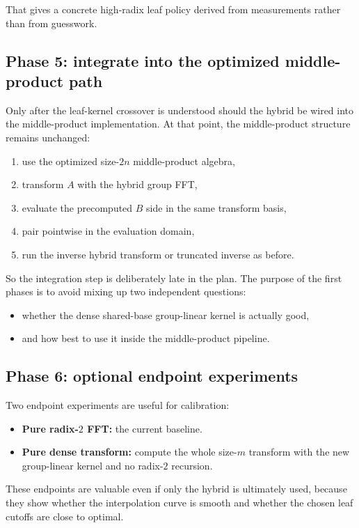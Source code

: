 \documentclass[11pt]{article}
\begin{document}
That gives a concrete high-radix leaf policy derived from measurements rather
than from guesswork.

\subsection{Phase 5: integrate into the optimized middle-product path}

Only after the leaf-kernel crossover is understood should the hybrid be wired
into the middle-product implementation.
At that point, the middle-product structure remains unchanged:
\begin{enumerate}[itemsep=0.3em, topsep=0.4em]
  \item use the optimized size-$2n$ middle-product algebra,
  \item transform $A$ with the hybrid group FFT,
  \item evaluate the precomputed $B$ side in the same transform basis,
  \item pair pointwise in the evaluation domain,
  \item run the inverse hybrid transform or truncated inverse as before.
\end{enumerate}

So the integration step is deliberately late in the plan.
The purpose of the first phases is to avoid mixing up two independent
questions:
\begin{itemize}[itemsep=0.3em, topsep=0.4em]
  \item whether the dense shared-base group-linear kernel is actually good,
  \item and how best to use it inside the middle-product pipeline.
\end{itemize}

\subsection{Phase 6: optional endpoint experiments}

Two endpoint experiments are useful for calibration:
\begin{itemize}[itemsep=0.3em, topsep=0.4em]
  \item \textbf{Pure radix-$2$ FFT:} the current baseline.
  \item \textbf{Pure dense transform:} compute the whole size-$m$ transform with
  the new group-linear kernel and no radix-$2$ recursion.
\end{itemize}

These endpoints are valuable even if only the hybrid is ultimately used,
because they show whether the interpolation curve is smooth and whether the
chosen leaf cutoffs are close to optimal.
\end{document}
